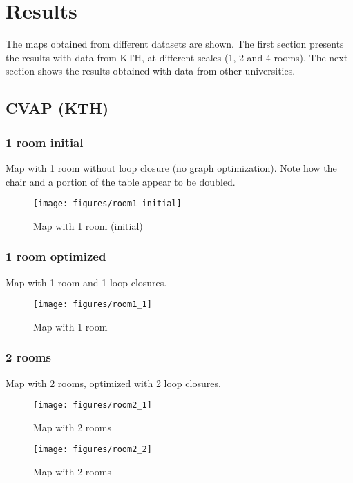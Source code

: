 \chapter{Results}

The maps obtained from different datasets are shown. The first section presents the results with data from KTH, at different scales (1, 2 and 4 rooms). The next section shows the results obtained with data from other universities.

\section{CVAP (KTH)}

\subsection{1 room initial}
Map with 1 room without loop closure (no graph optimization). Note how the chair and a portion of the table appear to be doubled.

\begin{figure}[h!]
\centering
\texttt{[image: figures/room1\_initial]}
\caption{Map with 1 room (initial)}
\end{figure}

\subsection{1 room optimized}
Map with 1 room and 1 loop closures.

\begin{figure}[h!]
\centering
\texttt{[image: figures/room1\_1]}
\caption{Map with 1 room}
\end{figure}

\clearpage

\subsection{2 rooms}
Map with 2 rooms, optimized with 2 loop closures.

\begin{figure}[h!]
\centering
\texttt{[image: figures/room2\_1]}
\caption{Map with 2 rooms}
\end{figure}

\begin{figure}[h!]
\centering
\texttt{[image: figures/room2\_2]}
\caption{Map with 2 rooms}
\end{figure}

